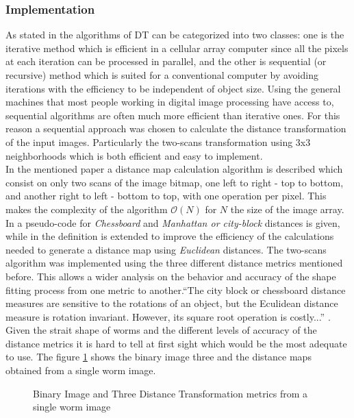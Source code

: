 \subsubsection{Implementation}
\label{sec:dtimp}

 As stated in \cite[p.196]{fastdt} the algorithms of DT can be categorized into two classes: one is the iterative 
 method which is efficient in a cellular array computer since all the pixels at each iteration can be processed in parallel, and the other 
is sequential (or recursive) method which is suited for a conventional computer by
 avoiding iterations with the efficiency to be independent of object size. 
Using the general machines that most people working in digital image processing
 have access to, sequential algorithms are often much more efficient than
 iterative ones. For this reason a sequential approach was chosen to calculate the
distance transformation of the input images. Particularly the two-scans transformation
using 3x3 neighborhoods \cite{fastdt} which is both efficient and easy to implement.\\

In the mentioned paper a distance map calculation algorithm is described which consist
on only two scans of the image bitmap, one left to right - top to bottom, and another
right to left - bottom to top, with one operation per pixel. This makes the complexity
of the algorithm $\mathcal{O}(N)$ for $N$ the size of the image array.
In \cite[p.197]{fastdt} a pseudo-code for \emph{Chessboard} and 
\emph{Manhattan or city-block} distances is given, while in \cite[p.198]{fastdt} the 
definition is extended to improve the efficiency of the calculations needed to 
generate a distance map using \emph{Euclidean} distances.
The two-scans algorithm was implemented using the three different distance metrics
mentioned before. This allows a wider analysis on the behavior and accuracy of the shape 
fitting process from one metric to another.``The city block or chessboard distance
measures are sensitive to the rotations of an object, but the Eculidean distance
measure is rotation invariant. However, its square root operation is costly...''
\cite[p.332]{eucskeleton}. Given the strait shape of worms and the different levels
of accuracy of the distance metrics it is hard to tell at first sight which would be 
the most adequate to use.
The figure \ref{fig:distance} shows the binary image three and the distance maps obtained 
from a single worm image.

\begin{figure}
  \centering
\qquad
\qquad                
\qquad
  \caption{Binary Image and Three Distance Transformation metrics from a single worm image}
  \label{fig:distance}
\end{figure}


